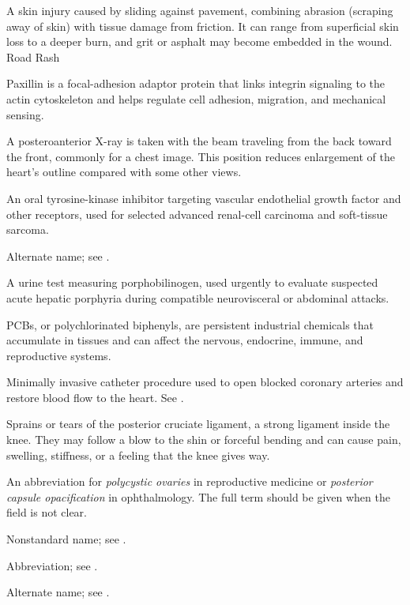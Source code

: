  A skin injury caused by sliding against pavement, combining abrasion (scraping away of skin) with tissue damage from friction. It can range from superficial skin loss to a deeper burn, and grit or asphalt may become embedded in the wound.
\synonyms
Road Rash

 Paxillin is a focal-adhesion adaptor protein that links integrin signaling to the actin cytoskeleton and helps regulate cell adhesion, migration, and mechanical sensing.

 A posteroanterior X-ray is taken with the beam traveling from the back toward the front, commonly for a chest image. This position reduces enlargement of the heart’s outline compared with some other views.

 An oral tyrosine-kinase inhibitor targeting vascular endothelial growth factor and other receptors, used for selected advanced renal-cell carcinoma and soft-tissue sarcoma.

 Alternate name; see .

 A urine test measuring porphobilinogen, used urgently to evaluate suspected acute hepatic porphyria during compatible neurovisceral or abdominal attacks.

 PCBs, or polychlorinated biphenyls, are persistent industrial chemicals that accumulate in tissues and can affect the nervous, endocrine, immune, and reproductive systems.

 Minimally invasive catheter procedure used to open blocked coronary arteries and restore blood flow to the heart. See .

 Sprains or tears of the posterior cruciate ligament, a strong ligament inside the knee. They may follow a blow to the shin or forceful bending and can cause pain, swelling, stiffness, or a feeling that the knee gives way.

 An abbreviation for \textit{polycystic ovaries} in reproductive medicine or \textit{posterior capsule opacification} in ophthalmology. The full term should be given when the field is not clear.

 Nonstandard name; see .

 Abbreviation; see .

 Alternate name; see .

